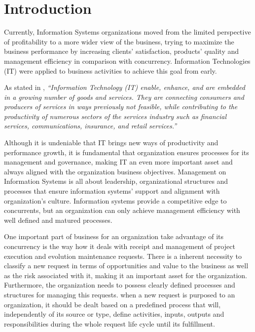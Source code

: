 
% 
% 

\section{Introduction}


Currently, Information Systems organizations moved from the limited perspective of profitability to a more wider view of the business, trying to maximize the business performance by increasing clients' satisfaction, products' quality and management efficiency in comparison with concurrency. Information Technologies (IT) were applied to business activities to achieve this goal from early.\par 
As stated in \cite{itilSS}, \textit{``Information Technology (IT) enable, enhance, and are embedded in a growing number of goods and services. They are connecting consumers and producers of services in ways previously not feasible, while contributing to the productivity of numerous sectors of the services industry such as financial services, communications, insurance, and retail services.''}\par
Although it is undeniable that IT brings new ways of productivity and performance growth, it is fundamental that organization ensures processes for its management and governance, making IT an even more important asset and always aligned with the organization business objectives. Management on Information Systems is all about leadership, organizational structures and processes that ensure information systems' support and alignment with organization's culture. Information systems provide a competitive edge to concurrents, but an organization can only achieve management efficiency with well defined and matured processes.\par
One important part of business for an organization take advantage of its concurrency is the way how it deals with receipt and management of project execution and evolution maintenance requests. There is a inherent necessity to classify a new request in terms of opportunities  and value to the business as well as the risk associated with it, making it an important asset for the organization. Furthermore, the organization needs to possess clearly defined processes and structures for managing this requests. when a new request is purposed to an organization, it should be dealt based on a predefined process that will, independently of its source or type, define activities, inputs, outputs and responsibilities during the whole request life cycle until its fulfillment. \par
